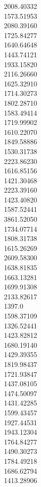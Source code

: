 2008.40332\\
1573.51953\\
2080.39160\\
1725.84277\\
1640.64648\\
1443.74121\\
1933.15820\\
2116.26660\\
1625.32910\\
1714.30273\\
1802.28710\\
1583.49414\\
1719.99902\\
1610.22070\\
1849.58886\\
1530.31738\\
2223.86230\\
1616.85156\\
1421.30468\\
2223.39160\\
1423.40820\\
1587.52441\\
3861.52050\\
1734.07714\\
1808.31738\\
1615.26269\\
2609.58300\\
1638.81835\\
1663.13281\\
1699.91308\\
2133.82617\\
1397.0\\
1598.37109\\
1326.52441\\
1423.82812\\
1680.19140\\
1429.39355\\
1819.98437\\
1721.93847\\
1437.08105\\
1474.50097\\
1431.42285\\
1599.43457\\
1927.44531\\
1943.12304\\
1764.84277\\
1490.30273\\
1784.49218\\
1686.62794\\
1413.28906\\
